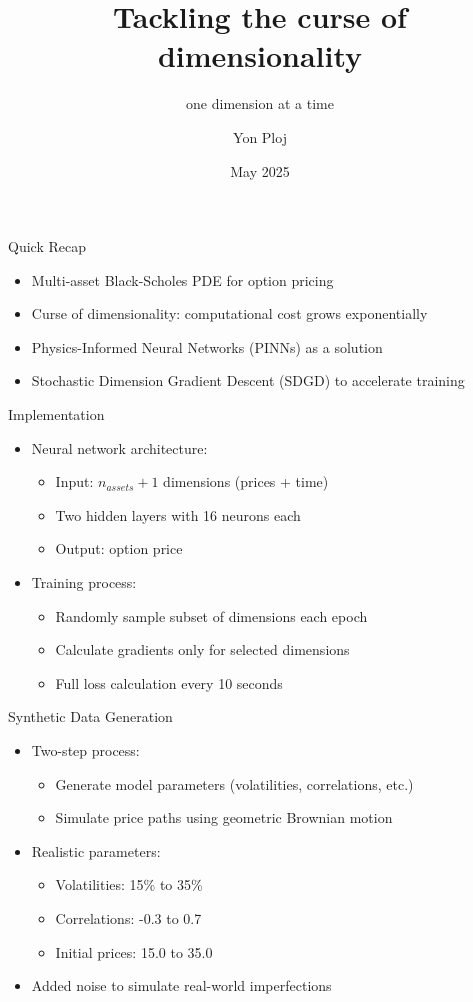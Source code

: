 \documentclass{beamer}
\title{Tackling the curse of dimensionality}
\subtitle{one dimension at a time}
\author{Yon Ploj}
\institute{Univerza v Ljubljani, fakulteta za računalništvo in informatiko}
\date{May 2025}
\begin{document}
\frame{\titlepage}

\begin{frame}{Quick Recap}
\begin{itemize}
    \item Multi-asset Black-Scholes PDE for option pricing
    \item Curse of dimensionality: computational cost grows exponentially
    \item Physics-Informed Neural Networks (PINNs) as a solution
    \item Stochastic Dimension Gradient Descent (SDGD) to accelerate training
\end{itemize}
\end{frame}

\begin{frame}{Implementation}
\begin{itemize}
    \item Neural network architecture:
    \begin{itemize}
        \item Input: $n_{assets} + 1$ dimensions (prices + time)
        \item Two hidden layers with 16 neurons each
        \item Output: option price
    \end{itemize}
    \item Training process:
    \begin{itemize}
        \item Randomly sample subset of dimensions each epoch
        \item Calculate gradients only for selected dimensions
        \item Full loss calculation every 10 seconds
    \end{itemize}
\end{itemize}
\end{frame}

\begin{frame}{Synthetic Data Generation}
\begin{itemize}
    \item Two-step process:
    \begin{itemize}
        \item Generate model parameters (volatilities, correlations, etc.)
        \item Simulate price paths using geometric Brownian motion
    \end{itemize}
    \item Realistic parameters:
    \begin{itemize}
        \item Volatilities: 15\% to 35\%
        \item Correlations: -0.3 to 0.7
        \item Initial prices: 15.0 to 35.0
    \end{itemize}
    \item Added noise to simulate real-world imperfections
\end{itemize}
\end{frame}
\end{document}
